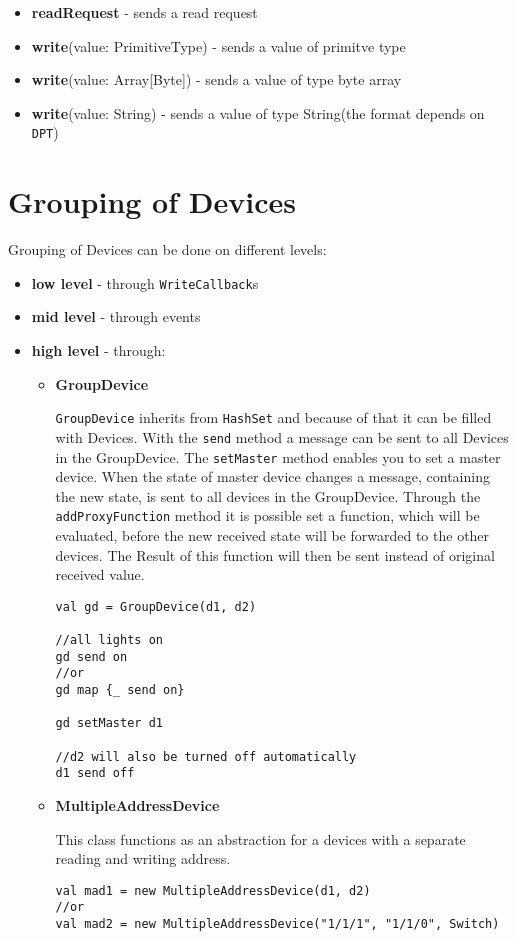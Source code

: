 \begin{itemize}
  \item \textbf{readRequest} - sends a read request
  \item \textbf{write}(value: PrimitiveType) - sends a value of primitve type
  \item \textbf{write}(value: Array[Byte]) - sends a value of type byte array
  \item \textbf{write}(value: String) - sends a value of type String(the format depends on \lstinline!DPT!)
\end{itemize}
\section{Grouping of Devices}

Grouping of Devices can be done on different levels:

\begin{itemize}
  \item \textbf{low level} - through \lstinline!WriteCallback!s
  \item \textbf{mid level} - through events
  \item \textbf{high level} - through:
    \begin{itemize}
        \item \textbf{GroupDevice}
        
        \lstinline!GroupDevice! inherits from \lstinline!HashSet! and because of that it can be filled with Devices. With the \lstinline!send! method a message can be sent to all Devices in the GroupDevice. The \lstinline!setMaster! method enables you to set a master device. When the state of master device changes a message, containing the new state, is sent to all devices in the GroupDevice. Through the \lstinline!addProxyFunction! method it is possible set a function, which will be evaluated, before the new received state will be forwarded to the other devices. The Result of this function will then be sent instead of original received value.
        

\begin{lstlisting}
val gd = GroupDevice(d1, d2)

//all lights on
gd send on
//or
gd map {_ send on}

gd setMaster d1

//d2 will also be turned off automatically
d1 send off
\end{lstlisting}
        \item \textbf{MultipleAddressDevice}

        This class functions as an abstraction for a devices with a separate reading and writing address.
\begin{lstlisting}
val mad1 = new MultipleAddressDevice(d1, d2)
//or
val mad2 = new MultipleAddressDevice("1/1/1", "1/1/0", Switch)
\end{lstlisting}
    \end{itemize}
\end{itemize}
